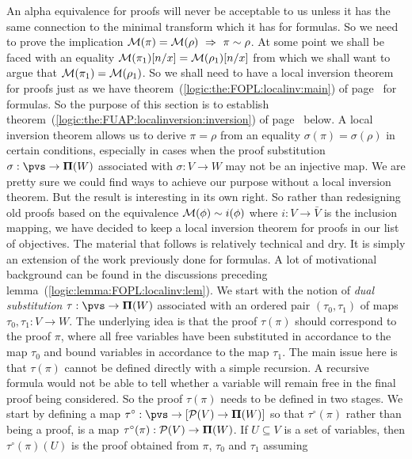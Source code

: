 An alpha equivalence for proofs will never be acceptable to us
unless it has the same connection to the minimal transform which it
has for formulas. So we need to prove the implication ${\cal
M}(\pi)={\cal M}(\rho)\ \Rightarrow\ \pi\sim\rho$. At some point we
shall be faced with an equality ${\cal M}(\pi_{1})[n/x]={\cal
M}(\rho_{1})[n/x]$ from which we shall want to argue that ${\cal
M}(\pi_{1})={\cal M}(\rho_{1})$. So we shall need to have a local
inversion theorem for proofs just as we have
theorem~(\ref{logic:the:FOPL:localinv:main}) of
page~\pageref{logic:the:FOPL:localinv:main} for formulas. So the
purpose of this section is to establish
theorem~(\ref{logic:the:FUAP:localinversion:inversion}) of
page~\pageref{logic:the:FUAP:localinversion:inversion} below. A
local inversion theorem allows us to derive $\pi=\rho$ from an
equality $\sigma(\pi)=\sigma(\rho)$ in certain conditions,
especially in cases when the proof substitution $\sigma:\pvs\to{\bf
\Pi}(W)$ associated with $\sigma:V\to W$ may not be an injective
map. We are pretty sure we could find ways to achieve our purpose
without a local inversion theorem. But the result is interesting in
its own right. So rather than redesigning old proofs based on the
equivalence ${\cal M}(\phi)\sim i(\phi)$ where $i:V\to\bar{V}$ is
the inclusion mapping, we have decided to keep a local inversion
theorem for proofs in our list of objectives. The material that
follows is relatively technical and dry. It is simply an extension
of the work previously done for formulas. A lot of motivational
background can be found in the discussions preceding
lemma~(\ref{logic:lemma:FOPL:localinv:lem}). We start with the
notion of {\em dual substitution} $\tau:\pvs\to{\bf\Pi}(W)$
associated with an ordered pair $(\tau_{0},\tau_{1})$ of maps
$\tau_{0},\tau_{1}:V\to W$. The underlying idea is that the proof
$\tau(\pi)$ should correspond to the proof $\pi$, where all free
variables have been substituted in accordance to the map $\tau_{0}$
and bound variables in accordance to the map $\tau_{1}$. The main
issue here is that $\tau(\pi)$ cannot be defined directly with a
simple recursion. A recursive formula would not be able to tell
whether a variable will remain free in the final proof being
considered. So the proof $\tau(\pi)$ needs to be defined in two
stages. We start by defining a map $\tau^{\circ}:\pvs\to[{\cal
P}(V)\to{\bf\Pi}(W)]$ so that $\tau^{\circ}(\pi)$ rather than being
a proof, is a map $\tau^{\circ}(\pi):{\cal P}(V)\to{\bf\Pi}(W)$. If
$U\subseteq V$ is a set of variables, then $\tau^{\circ}(\pi)(U)$ is
the proof obtained from $\pi$, $\tau_{0}$ and $\tau_{1}$ assuming
